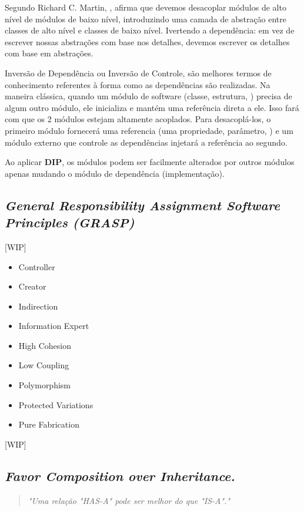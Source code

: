\documentclass[12pt]{article}
\begin{document}
Segundo Richard C. Martin, \cite{ROBERT_MARTIN_THE_CLEAN_ARCHITECTURE}, afirma que devemos desacoplar módulos de alto nível de módulos de baixo nível, introduzindo uma camada de abstração entre classes de alto nível e classes de baixo nível. Ivertendo a dependência: em vez de escrever nossas abstrações com base nos detalhes, devemos escrever os detalhes com base em abstrações.

Inversão de Dependência ou Inversão de Controle, são melhores termos de conhecimento referentes à forma como as dependências são realizadas. Na maneira clássica, quando um módulo de software (classe, estrutura, ) precisa de algum outro módulo, ele inicializa e mantém uma referência direta a ele. Isso fará com que os 2 módulos estejam altamente acoplados. Para desacoplá-los, o primeiro módulo fornecerá uma referencia (uma propriedade, parâmetro, ) e um módulo externo que controle as dependências injetará a referência ao segundo.

Ao aplicar \textbf{DIP}, os módulos podem ser facilmente alterados por outros módulos apenas mudando o módulo de dependência (implementação).


\subsection{\textit{General Responsibility Assignment Software Principles (GRASP)}} \label{sec:grasp}
[WIP]
\begin{itemize}
	\item Controller	
	\item Creator
	\item Indirection
	\item Information Expert
	\item High Cohesion
	\item Low Coupling
	\item Polymorphism
	\item Protected Variations
	\item Pure Fabrication
\end{itemize}
[WIP]

\subsection{\textit{Favor Composition over Inheritance.}} \label{sec:favor_composition}
\begin{quote}
\textit{"Uma relação "HAS-A" pode ser melhor do que "IS-A"."}\cite{HEADFIRST_DESIGN_PATTERN}
\end{quote}
\end{document}
